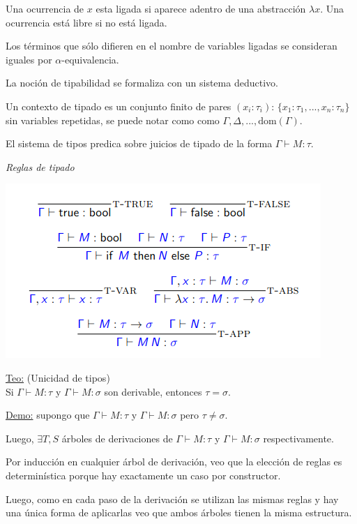 \documentclass[12pt]{extarticle}
\def\demostracion{\underline{Demo:} }
\def\teorema{\underline{Teo:} }
\begin{document}
Una ocurrencia de $x$ esta ligada si aparece adentro de una abstracción $\lambda x$. Una ocurrencia está libre si no está ligada.

Los términos que sólo difieren en el nombre de variables ligadas se consideran iguales por $\alpha$-equivalencia.

La noción de tipabilidad se formaliza con un sistema deductivo.

Un contexto de tipado es un conjunto finito de pares $(x_i : \tau_i)$: $\{x_1 : \tau_1,...,x_n : \tau_n\}$ sin variables repetidas, se puede notar como como $\Gamma, \Delta, ..., \text{dom}(\Gamma)$.

El sistema de tipos predica sobre juicios de tipado de la forma $\Gamma \vdash M : \tau$.

\textit{Reglas de tipado}

\begin{center}
\includegraphics[scale=0.75]{reglas-tipado.png}
\end{center}

\teorema (Unicidad de tipos) \\
Si $\Gamma \vdash M : \tau$ y $\Gamma \vdash M : \sigma$ son derivable, entonces $\tau = \sigma$.

\demostracion supongo que $\Gamma \vdash M : \tau$ y $\Gamma \vdash M : \sigma$ pero $\tau \neq \sigma$.

Luego, $\exists T, S$ árboles de derivaciones de $\Gamma \vdash M : \tau$ y $\Gamma \vdash M : \sigma$ respectivamente.

Por inducción en cualquier árbol de derivación, veo que la elección de reglas es determinística porque hay exactamente un caso por constructor.

Luego, como en cada paso de la derivación se utilizan las mismas reglas y hay una única forma de aplicarlas veo que ambos árboles tienen la misma estructura.
\end{document}

